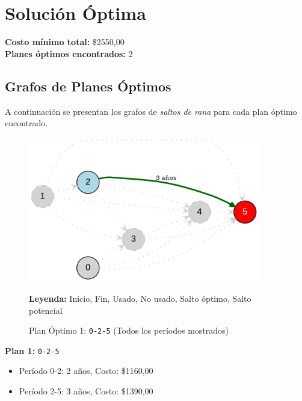 \documentclass[12pt]{article}
\begin{document}
\clearpage
\section*{Solución Óptima}
\textbf{Costo mínimo total:} \$2550,00\\
\textbf{Planes óptimos encontrados:} 2
\subsection*{Grafos de Planes Óptimos}
A continuación se presentan los grafos de \emph{saltos de rana} para cada plan óptimo encontrado.

\begin{figure}[H]
\centering
\includegraphics[width=0.9\textwidth]{Remplazo1111_plan_1.png}
\caption{Plan Óptimo 1: \texttt{0-2-5} (Todos los períodos mostrados)}
\textbf{Leyenda:} \textcolor{green}{\bullet} Inicio, \textcolor{red}{\bullet} Fin, \textcolor{blue}{\bullet} Usado, \textcolor{gray}{\bullet} No usado, \textcolor{darkgreen}{\rightarrow} Salto óptimo, \textcolor{gray}{\dashrightarrow} Salto potencial
\label{fig:plan1}
\end{figure}

\textbf{Plan 1:} \texttt{0-2-5}
\begin{itemize}\small
\item Período 0-2: 2 años, Costo: \$1160,00
\item Período 2-5: 3 años, Costo: \$1390,00
\end{itemize}
\end{document}
